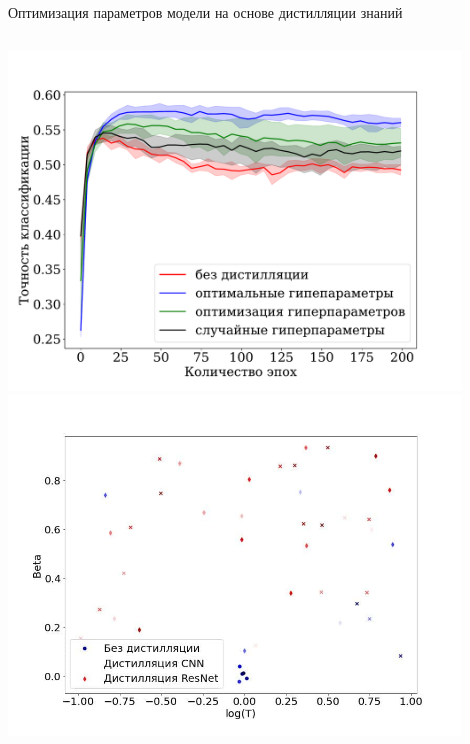 \documentclass[8pt, aspectratio=169]{beamer}
\begin{document}
\begin{frame}{Оптимизация параметров модели на основе дистилляции знаний}
\begin{columns}[c]
\includegraphics[width=0.9\textwidth]{acc.pdf}
\includegraphics[width=0.9\textwidth]{beta_temp_old.jpg}
\end{columns}

\end{frame}



\end{document}
